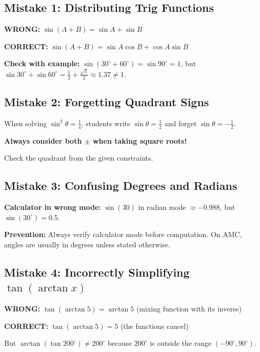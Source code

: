 \documentclass[12pt]{extarticle}
\begin{document}
\subsection{Mistake 1: Distributing Trig Functions}

\begin{warningbox}
\textbf{WRONG:} $\sin(A + B) = \sin A + \sin B$

\textbf{CORRECT:} $\sin(A + B) = \sin A\cos B + \cos A\sin B$

\textbf{Check with example:} $\sin(30^\circ + 60^\circ) = \sin 90^\circ = 1$, but $\sin 30^\circ + \sin 60^\circ = \frac{1}{2} + \frac{\sqrt{3}}{2} \approx 1.37 \ne 1$.
\end{warningbox}

\subsection{Mistake 2: Forgetting Quadrant Signs}

\begin{warningbox}
When solving $\sin^2\theta = \frac{1}{4}$, students write $\sin\theta = \frac{1}{2}$ and forget $\sin\theta = -\frac{1}{2}$.

\textbf{Always consider both $\pm$ when taking square roots!}

Check the quadrant from the given constraints.
\end{warningbox}

\subsection{Mistake 3: Confusing Degrees and Radians}

\begin{warningbox}
\textbf{Calculator in wrong mode:} $\sin(30)$ in radian mode $\approx -0.988$, but $\sin(30^\circ) = 0.5$.

\textbf{Prevention:} Always verify calculator mode before computation. On AMC, angles are usually in degrees unless stated otherwise.
\end{warningbox}

\subsection{Mistake 4: Incorrectly Simplifying $\tan(\arctan x)$}

\begin{warningbox}
\textbf{WRONG:} $\tan(\arctan 5) = \arctan 5$ (mixing function with its inverse)

\textbf{CORRECT:} $\tan(\arctan 5) = 5$ (the functions cancel)

But $\arctan(\tan 200^\circ) \ne 200^\circ$ because $200^\circ$ is outside the range $\left(-90^\circ, 90^\circ\right)$.
\end{warningbox}
\end{document}
